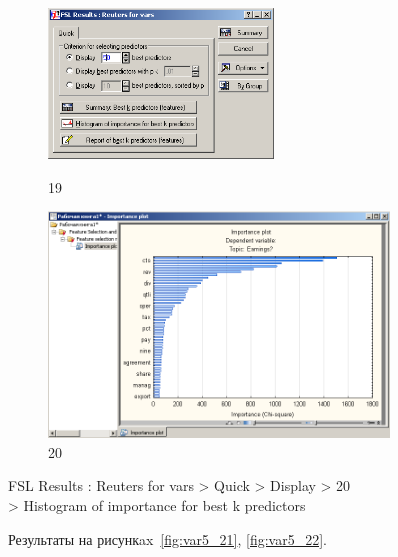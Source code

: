 \begin{figure}[!h]
  \centering

  \begin{minipage}{0.29\textwidth}
    \centering

    \includegraphics[height=4cm]
    {inc/var5/19.PNG}

    \caption{19}

    \label{fig:var5_19}
  \end{minipage}
  \begin{minipage}{0.69\textwidth}
    \centering

    \includegraphics[height=6cm]
    {inc/var5/20.PNG}

    \caption{20}

    \label{fig:var5_20}
  \end{minipage}
\end{figure}

FSL Results : Reuters for vars > Quick > Display > 20 \\
> Histogram of importance for best k predictors

Результаты на рисункax~\ref{fig:var5_21}, \ref{fig:var5_22}.


